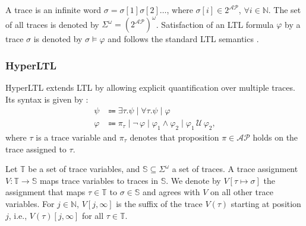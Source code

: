 \documentclass[journal,twoside,web]{ieeecolor}
\begin{document}
A trace is an infinite word $\sigma = \sigma[1] \sigma[2] \dots$, where $\sigma[i] \in 2^\mathcal{AP}$, $\forall i \in \mathbb{N}$. The set of all traces is denoted by $\Sigma^\omega = (2^\mathcal{AP})^\omega$. Satisfaction of an LTL formula $\varphi$ by a trace $\sigma$ is denoted by $\sigma \models \varphi$ and follows the standard LTL semantics \cite{baier2008}.

\subsubsection{HyperLTL}

HyperLTL extends LTL by allowing explicit quantification over multiple traces. Its syntax is given by \cite{clarkson2014}:
\begin{equation*} \label{eq:hyperltl}
    \begin{aligned}
        \psi &\Coloneqq \exists \tau. \psi \mid \forall \tau .  \psi \mid \varphi \\
        \varphi &\Coloneqq \pi_\tau \mid \lnot \, \varphi \mid \varphi_1 \land \varphi_2 \mid \varphi_1 \, \mathcal{U} \, \varphi_2,
    \end{aligned}
\end{equation*}
where $\tau$ is a trace variable and $\pi_\tau$ denotes that proposition $\pi \in \mathcal{AP}$ holds on the trace assigned to $\tau$. 

Let $\mathbb{T}$ be a set of trace variables, and $\mathbb{S} \subseteq \Sigma^\omega$ a set of traces. A trace assignment $V: \mathbb{T} \to \mathbb{S}$ maps trace variables to traces in $\mathbb{S}$. We denote by $V[\tau \mapsto \sigma]$ the assignment that maps $\tau \in \mathbb{T}$ to $\sigma \in \mathbb{S}$ and agrees with $V$ on all other trace variables. For $j \in \mathbb{N}$, $V[j, \infty]$ is the suffix of the trace $V(\tau)$ starting at position $j$, i.e., $V(\tau)[j, \infty]$ for all $\tau \in \mathbb{T}$. 
\end{document}
